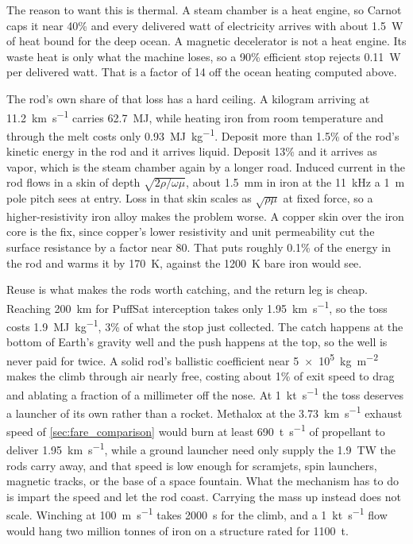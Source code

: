 \documentclass{article}
\begin{document}
The reason to want this is thermal.  A steam chamber is a heat engine, so Carnot caps it near 40\% and every delivered watt of electricity arrives with about \SI{1.5}{\watt} of heat bound for the deep ocean.  A magnetic decelerator is not a heat engine.  Its waste heat is only what the machine loses, so a 90\% efficient stop rejects \SI{0.11}{\watt} per delivered watt.  That is a factor of 14 off the ocean heating computed above.

The rod's own share of that loss has a hard ceiling.  A kilogram arriving at \SI{11.2}{\kilo\meter\per\second} carries \SI{62.7}{\mega\joule}, while heating iron from room temperature and through the melt costs only \SI{0.93}{\mega\joule\per\kilo\gram}.  Deposit more than 1.5\% of the rod's kinetic energy in the rod and it arrives liquid.  Deposit 13\% and it arrives as vapor, which is the steam chamber again by a longer road.  Induced current in the rod flows in a skin of depth $\sqrt{2\rho/\omega\mu}$, about \SI{1.5}{\milli\meter} in iron at the \SI{11}{\kilo\hertz} a \SI{1}{\meter} pole pitch sees at entry.  Loss in that skin scales as $\sqrt{\rho\mu}$ at fixed force, so a higher-resistivity iron alloy makes the problem worse.  A copper skin over the iron core is the fix, since copper's lower resistivity and unit permeability cut the surface resistance by a factor near 80.  That puts roughly 0.1\% of the energy in the rod and warms it by \SI{170}{\kelvin}, against the \SI{1200}{\kelvin} bare iron would see.

Reuse is what makes the rods worth catching, and the return leg is cheap.  Reaching \SI{200}{\kilo\meter} for PuffSat interception takes only \SI{1.95}{\kilo\meter\per\second}, so the toss costs \SI{1.9}{\mega\joule\per\kilo\gram}, 3\% of what the stop just collected.  The catch happens at the bottom of Earth's gravity well and the push happens at the top, so the well is never paid for twice.  A solid rod's ballistic coefficient near \SI{5e5}{\kilo\gram\per\square\meter} makes the climb through air nearly free, costing about 1\% of exit speed to drag and ablating a fraction of a millimeter off the nose.  At \SI{1}{\kilo\tonne\per\second} the toss deserves a launcher of its own rather than a rocket.  Methalox at the \SI{3.73}{\kilo\meter\per\second} exhaust speed of \autoref{sec:fare_comparison} would burn at least \SI{690}{\tonne\per\second} of propellant to deliver \SI{1.95}{\kilo\meter\per\second}, while a ground launcher need only supply the \SI{1.9}{\tera\watt} the rods carry away, and that speed is low enough for scramjets, spin launchers, magnetic tracks, or the base of a space fountain.  What the mechanism has to do is impart the speed and let the rod coast.  Carrying the mass up instead does not scale.  Winching at \SI{100}{\meter\per\second} takes \SI{2000}{\second} for the climb, and a \SI{1}{\kilo\tonne\per\second} flow would hang two million tonnes of iron on a structure rated for \SI{1100}{\tonne}.
\end{document}
